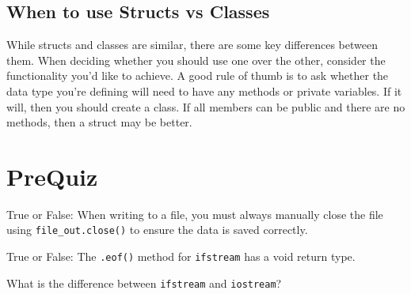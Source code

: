 \subsection{When to use Structs vs Classes}
While structs and classes are similar, there are some key differences between them. When deciding whether you should use one over the other, consider the functionality you'd like to achieve. A good rule of thumb is to ask whether the data type you're defining will need to have any methods or private variables. If it will, then you should create a class. If all members can be public and there are no methods, then a struct may be better.

\section{PreQuiz}
\begin{problem}
    True or False: When writing to a file, you must always manually close the file using \texttt{file_out.close()} to ensure the data is saved correctly.
\end{problem}

\begin{problem}
    True or False: The \texttt{.eof()} method for \texttt{ifstream} has a void return type.
\end{problem}

\begin{problem}
What is the difference between \texttt{ifstream} and \texttt{iostream}?
\end{problem}


